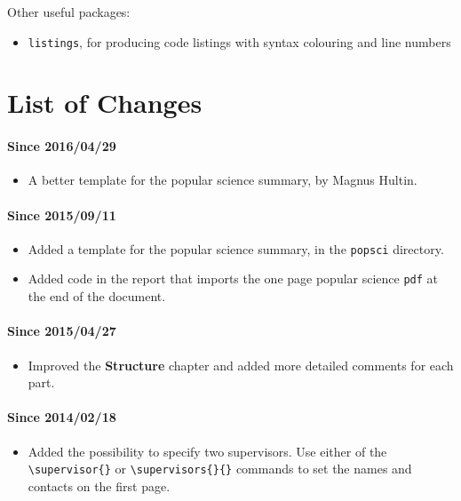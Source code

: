 \documentclass{cslthse-msc}
\begin{document}
\begin{appendices}
\noindent Other useful packages:
\begin{itemize}
\item \texttt{listings}, for producing code listings with syntax colouring and line numbers
\end{itemize}

\chapter{List of Changes}

\subsubsection{Since 2016/04/29}
\begin{itemize}
\item A better template for the popular science summary, by Magnus Hultin.
\end{itemize}

\subsubsection{Since 2015/09/11}
\begin{itemize}
\item Added a template for the popular science summary, in the \verb+popsci+ directory.
\item Added code in the report that imports the one page popular science \texttt{pdf} at the end of the document.
\end{itemize}

\subsubsection{Since 2015/04/27}
\begin{itemize}
\item Improved the \textbf{Structure} chapter and added more detailed comments for each part.
\end{itemize}

\subsubsection{Since 2014/02/18}
\begin{itemize}
\item Added the possibility to specify two supervisors. Use either of the \verb+\supervisor{}+ or \verb+\supervisors{}{}+ commands to set the names and contacts on the first page.
\end{itemize}


\end{appendices}
\end{document}
